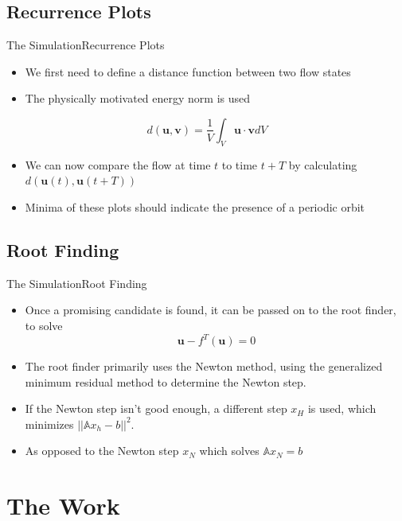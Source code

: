 \documentclass[10pt]{beamer}
\newcommand{\Vector}[1]{\mathbf{#1}}
\begin{document}
\subsection{Recurrence Plots}
\begin{frame}{The Simulation}{Recurrence Plots}
\begin{itemize}
\item<1-> We first need to define a distance function between two flow states
\item<2-> The physically motivated energy norm is used
\end{itemize}
\pause
\begin{equation}
d(\Vector{u},\Vector{v}) = \frac{1}{V}\int_V{\Vector{u}\cdot\Vector{v}}{dV}
\end{equation}
\begin{itemize}
\item<1-> We can now compare the flow at time $t$ to time $t+T$ by calculating $d(\Vector{u}(t),\Vector{u}(t+T))$
\item<2-> Minima of these plots should indicate the presence of a periodic orbit
\end{itemize}
\end{frame}
\subsection{Root Finding}
\begin{frame}{The Simulation}{Root Finding}
\begin{itemize}
\item<1-> Once a promising candidate is found, it can be passed on to the root finder, to solve 
\begin{equation}
\Vector{u} - f^T(\Vector{u}) = 0
\end{equation}
\item<2-> The root finder primarily uses the Newton method, using the generalized minimum residual method to determine the Newton step. 
\item<3-> If the Newton step isn't good enough, a different step $x_H$ is used, which minimizes $||\mathbb{A}x_h - b||^2$.
\item<4-> As opposed to the Newton step $x_N$ which solves $\mathbb{A}x_N = b$ 
\end{itemize}
\end{frame}
\section{The Work}
\end{document}
